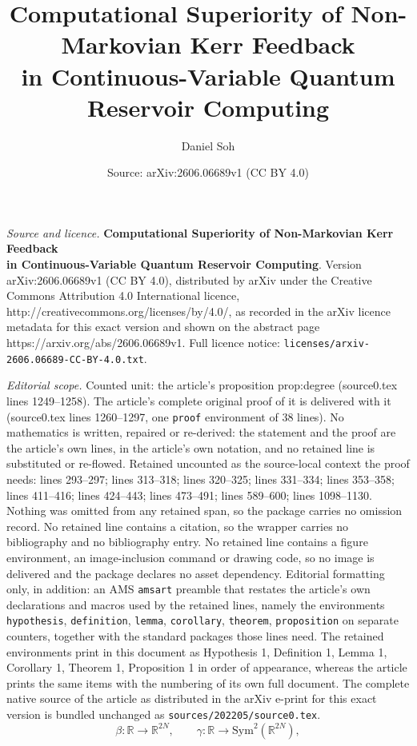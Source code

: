 \documentclass[10pt,a4paper]{amsart}
\title{\textbf{Computational Superiority of Non-Markovian Kerr Feedback\\ in Continuous-Variable Quantum Reservoir Computing}}
\author{Daniel Soh}
\date{Source: arXiv:2606.06689v1 (CC BY 4.0)}
\newcommand{\Sym}{\mathrm{Sym}}
\begin{document}
\maketitle

\noindent\emph{Source and licence.} \textbf{Computational Superiority of Non-Markovian Kerr Feedback\\ in Continuous-Variable Quantum Reservoir Computing}. Version arXiv:2606.06689v1 (CC BY 4.0), distributed by arXiv under the Creative Commons Attribution 4.0 International licence, http://creativecommons.org/licenses/by/4.0/, as recorded in the arXiv licence metadata for this exact version and shown on the abstract page https://arxiv.org/abs/2606.06689v1. Full licence notice: \texttt{licenses/arxiv-2606.06689-CC-BY-4.0.txt}.\par\smallskip

\noindent\textit{Editorial scope.} Counted unit: the article's proposition prop:degree (source0.tex lines 1249--1258). The article's complete original proof of it is delivered with it (source0.tex lines 1260--1297, one \texttt{proof} environment of 38 lines). No mathematics is written, repaired or re-derived: the statement and the proof are the article's own lines, in the article's own notation, and no retained line is substituted or re-flowed.  Retained uncounted as the source-local context the proof needs: lines 293--297; lines 313--318; lines 320--325; lines 331--334; lines 353--358; lines 411--416; lines 424--443; lines 473--491; lines 589--600; lines 1098--1130.  Nothing was omitted from any retained span, so the package carries no omission record.  No retained line contains a citation, so the wrapper carries no bibliography and no bibliography entry.  No retained line contains a figure environment, an image-inclusion command or drawing code, so no image is delivered and the package declares no asset dependency.  Editorial formatting only, in addition: an AMS \texttt{amsart} preamble that restates the article's own declarations and macros used by the retained lines, namely the environments \texttt{hypothesis}, \texttt{definition}, \texttt{lemma}, \texttt{corollary}, \texttt{theorem}, \texttt{proposition} on separate counters, together with the standard packages those lines need.  The retained environments print in this document as Hypothesis 1, Definition 1, Lemma 1, Corollary 1, Theorem 1, Proposition 1 in order of appearance, whereas the article prints the same items with the numbering of its own full document.  The complete native source of the article as distributed in the arXiv e-print for this exact version is bundled unchanged as \texttt{sources/202205/source0.tex}.
\begin{equation}
\beta:\mathbb{R}\to\mathbb{R}^{2N},\qquad
\gamma:\mathbb{R}\to\Sym^2(\mathbb{R}^{2N}),
\label{eq:inject}
\end{equation}
\end{document}
